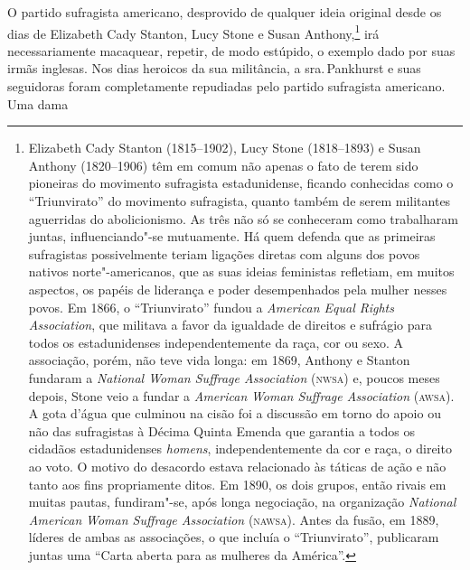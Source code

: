 O partido sufragista americano, desprovido de qualquer ideia original
desde os dias de Elizabeth Cady Stanton, Lucy Stone e Susan
Anthony,\footnote{Elizabeth Cady Stanton (1815--1902), Lucy Stone
  (1818--1893) e Susan Anthony (1820--1906) têm em comum não apenas o fato
  de terem sido pioneiras do movimento sufragista estadunidense, ficando
  conhecidas como o ``Triunvirato'' do movimento sufragista, quanto
  também de serem militantes aguerridas do abolicionismo. As três não só
  se conheceram como trabalharam juntas, influenciando"-se mutuamente. Há
  quem defenda que as primeiras sufragistas possivelmente teriam ligações diretas com
  alguns dos povos nativos norte"-americanos, que as suas ideias
  feministas refletiam, em muitos aspectos, os papéis de liderança e
  poder desempenhados pela mulher nesses povos. Em 1866, o
  ``Triunvirato'' fundou a \emph{American Equal Rights Association}, que
  militava a favor da igualdade de direitos e sufrágio para todos os
  estadunidenses independentemente da raça, cor ou sexo. A associação,
  porém, não teve vida longa: em 1869, Anthony e Stanton fundaram a
  \emph{National Woman Suffrage Association} (\textsc{nwsa}) e, poucos meses
  depois, Stone veio a fundar a \emph{American} \emph{Woman Suffrage
  Association} (\textsc{awsa}). A gota d'água que culminou na cisão foi a
  discussão em torno do apoio ou não das sufragistas à Décima Quinta
  Emenda que garantia a todos os cidadãos estadunidenses \emph{homens},
  independentemente da cor e raça, o direito ao voto. O motivo do
  desacordo estava relacionado às táticas de ação e não tanto aos fins
  propriamente ditos. Em 1890, os dois grupos, então rivais em muitas
  pautas, fundiram"-se, após longa negociação, na organização
  \emph{National American} \emph{Woman Suffrage Association} (\textsc{nawsa}).
  Antes da fusão, em 1889, líderes de ambas as associações, o que
  incluía o ``Triunvirato'', publicaram juntas uma ``Carta aberta para
  as mulheres da América''.} irá necessariamente macaquear, repetir, de
modo estúpido, o exemplo dado por suas irmãs inglesas. Nos dias heroicos
da sua militância, a sra.\,Pankhurst e suas seguidoras foram
completamente repudiadas pelo partido sufragista americano. Uma dama
